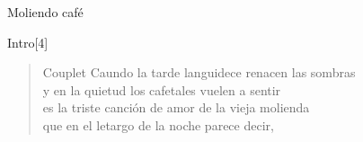 \begin{song}[tropical]{Moliendo café}



\begin{instrumental}{Intro}[4]
\measure{}
\measure{}\measure{}\measure{}
\measure{$\downarrow$}
\end{instrumental}

\begin{verse}{Couplet}
Caundo la tarde languidece renacen las sombras\hspace{1.5em}\\
y en la quietud los cafetales vuelen a sentir\\
es la triste canción de amor de la vieja molienda\\
que en el letargo de la noche parece decir,\hspace{1em}\chord{$\downarrow\downarrow$}\hspace{1.5em}\chord{$\downarrow\downarrow$}
\end{verse}


\end{song}
